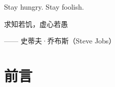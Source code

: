 \documentclass[12pt,a4paper,openany]{book}
\newcommand{\notebody}{
	\chapter*{前言}
	

	

	

	
}
\begin{document}
	

	\newpage

	\thispagestyle{empty}
	\vspace*{\fill}
	\begin{center}
		{\fontsize{18}{28}\selectfont Stay hungry. Stay foolish.\par}
		\vspace{0.9em}
		{\kaishu\fontsize{14}{20}\selectfont 求知若饥，虚心若愚\par}
		\vspace{1.2em}
		{\kaishu\fontsize{13}{19}\selectfont —— 史蒂夫·乔布斯（Steve Jobs）\par}
	\end{center}
	\vfill
	\newpage

	\pagestyle{mainstyle}

	\setcounter{tocdepth}{2}

	\tableofcontents

	\setcounter{page}{0}
	\thispagestyle{empty}
	\newpage
	\notebody
\end{document}
